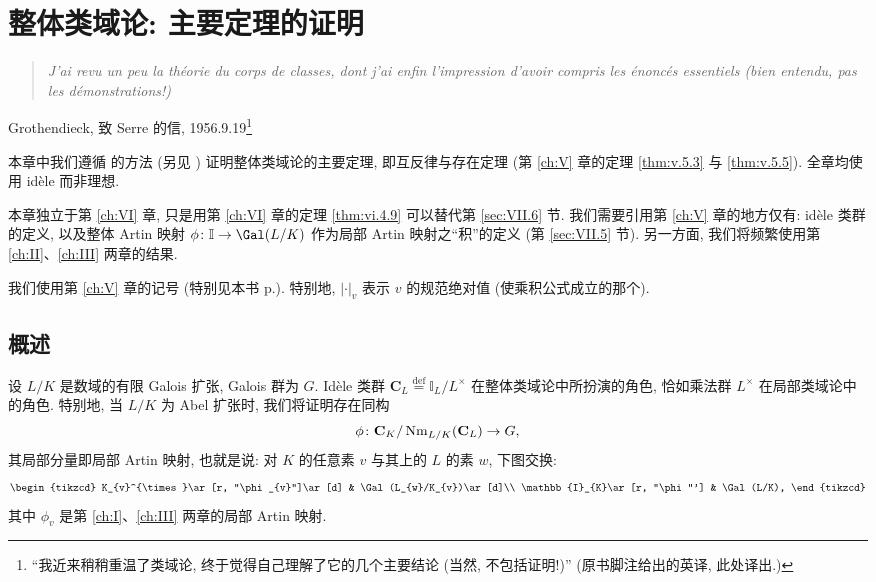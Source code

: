 \chapter{整体类域论: 主要定理的证明}\label{ch:VII}

\begin{quote}
\itshape J'ai revu un peu la théorie du corps de classes, dont j'ai enfin l'impression d'avoir compris les énoncés essentiels (bien entendu, pas les démonstrations!)
\end{quote}
\hspace*{\fill}Grothendieck, 致 Serre 的信, 1956.9.19\footnote{``我近来稍稍重温了类域论, 终于觉得自己理解了它的几个主要结论 (当然, 不包括证明!)'' (原书脚注给出的英译, 此处译出.)}

本章中我们遵循 \cite{Tate1967} 的方法 (另见 \cite{ArtinTate1961}) 证明整体类域论的主要定理, 即互反律与存在定理 (第 \ref{ch:V} 章的定理 \ref{thm:v.5.3} 与 \ref{thm:v.5.5}). 全章均使用 idèle 而非理想.

本章独立于第 \ref{ch:VI} 章, 只是用第 \ref{ch:VI} 章的定理 \ref{thm:vi.4.9} 可以替代第 \ref{sec:VII.6} 节. 我们需要引用第 \ref{ch:V} 章的地方仅有: idèle 类群的定义, 以及整体 Artin 映射 $\phi\colon\mathbb{I}\to\Gal(L/K)$ 作为局部 Artin 映射之``积''的定义 (第 \ref{sec:VII.5} 节). 另一方面, 我们将频繁使用第 \ref{ch:II}、\ref{ch:III} 两章的结果.

我们使用第 \ref{ch:V} 章的记号 (特别见本书 p.\pageref{pg:orig169}). 特别地, $|\cdot|_v$ 表示 $v$ 的规范绝对值 (使乘积公式成立的那个).

\section{概述}\label{sec:VII.1}

设 $L/K$ 是数域的有限 Galois 扩张, Galois 群为 $G$. Idèle 类群 $\mathbf{C}_L\overset{\text{def}}{=}\mathbb{I}_L/L^{\times}$ 在整体类域论中所扮演的角色, 恰如乘法群 $L^{\times}$ 在局部类域论中的角色. 特别地, 当 $L/K$ 为 Abel 扩张时, 我们将证明存在同构
\[
\phi\colon\mathbf{C}_{K}/\operatorname{Nm}_{L/K}(\mathbf{C}_{L})\to G,
\]
其局部分量即局部 Artin 映射, 也就是说: 对 $K$ 的任意素 $v$ 与其上的 $L$ 的素 $w$, 下图交换:
\[
\begin{tikzcd}
K_{v}^{\times}\ar[r, "\phi_{v}"]\ar[d] & \Gal(L_{w}/K_{v})\ar[d]\\
\mathbb{I}_{K}\ar[r, "\phi"'] & \Gal(L/K),
\end{tikzcd}
\]
其中 $\phi_v$ 是第 \ref{ch:I}、\ref{ch:III} 两章的局部 Artin 映射.

